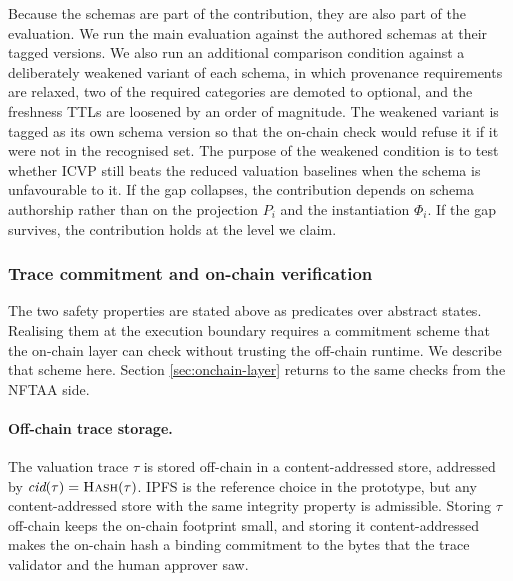 Because the schemas are part of the contribution, they are also part of the evaluation. We run the main evaluation against the authored schemas at their tagged versions. We also run an additional comparison condition against a deliberately weakened variant of each schema, in which provenance requirements are relaxed, two of the required categories are demoted to optional, and the freshness TTLs are loosened by an order of magnitude. The weakened variant is tagged as its own schema version so that the on-chain check would refuse it if it were not in the recognised set. The purpose of the weakened condition is to test whether ICVP still beats the reduced valuation baselines when the schema is unfavourable to it. If the gap collapses, the contribution depends on schema authorship rather than on the projection $P_i$ and the instantiation $\Phi_i$. If the gap survives, the contribution holds at the level we claim.

\subsubsection{Trace commitment and on-chain verification}
\label{sec:trace-commitment}

The two safety properties are stated above as predicates over abstract states. Realising them at the execution boundary requires a commitment scheme that the on-chain layer can check without trusting the off-chain runtime. We describe that scheme here. Section \ref{sec:onchain-layer} returns to the same checks from the NFTAA side.

\paragraph{Off-chain trace storage.}
The valuation trace $\tau$ is stored off-chain in a content-addressed store, addressed by $\textit{cid}(\tau) = \textsc{Hash}(\tau)$. IPFS is the reference choice in the prototype, but any content-addressed store with the same integrity property is admissible. Storing $\tau$ off-chain keeps the on-chain footprint small, and storing it content-addressed makes the on-chain hash a binding commitment to the bytes that the trace validator and the human approver saw.

